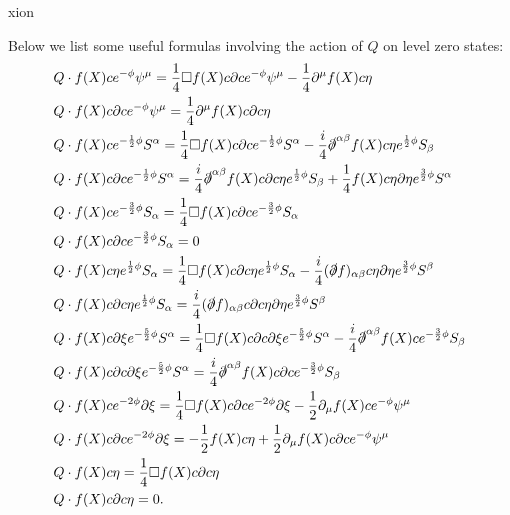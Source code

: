 xion\documentclass[12pt]{article}
\numberwithin{equation}{section}
\begin{document}
{\allowdisplaybreaks
Below we list some useful formulas involving the action of $Q$ on level zero states:
\begin{align}
&Q \cdot f(X) ce^{-\phi}\psi^\mu = \frac14 \Box f(X) c \partial c  e^{-\phi}\psi^\mu  - \frac{1}{4} \partial^\mu f(X) c\eta \\
&Q \cdot f(X) c \partial c e^{-\phi}\psi^\mu  = \frac{1}{4}\partial^\mu f(X) c \partial c \eta  \\
&Q \cdot f(X) ce^{-\frac12\phi}S^\alpha  = \frac14 \Box f(X) c \partial c  e^{-\frac12\phi}S^\alpha - \frac{i}{4} \slashed{\partial}^{\alpha\beta} f(X) c \eta e^{\frac{1}{2}\phi} S_\beta \\
&Q \cdot f(X) c \partial c e^{-\frac12\phi}S^\alpha  =  \frac{i}{4}\slashed{\partial}^{\alpha \beta}f(X) c\partial c \eta e^{\frac{1}{2}\phi}S_\beta + \frac{1}{4} f(X) c \eta \partial \eta e^{\frac32\phi} S^\alpha\\
&Q \cdot f(X) ce^{-\frac32\phi}S_\alpha = \frac14 \Box f(X) c \partial c e^{-\frac32\phi}S_\alpha \\
&Q \cdot f(X) c \partial ce^{-\frac32\phi}S_\alpha = 0 \\
& Q \cdot f(X) c \eta e^{\frac{1}{2}\phi} S_\alpha = \frac{1}{4} \Box f(X) c\partial c \eta e^{\frac{1}{2}\phi} S_\alpha - \frac{i}{4} (\slashed{\partial} f)_{\alpha \beta} c \eta \partial \eta e^{\frac{3}{2} \phi} S^\beta \\
& Q \cdot f(X) c \partial c \eta e^{\frac{1}{2}\phi} S_\alpha = \frac{i}{4} (\slashed{\partial} f)_{\alpha \beta} c \partial c \eta \partial \eta e^{\frac{3}{2} \phi} S^\beta\\
&Q \cdot f(X) c \partial \xi e^{-\frac52\phi}S^\alpha  = \frac14 \Box f(X) c \partial c \partial \xi e^{-\frac52\phi}S^\alpha - \frac{i}{4} \slashed{\partial}^{\alpha \beta}f(X) c e^{-\frac32\phi}S_\beta \\
&Q \cdot f(X) c \partial c \partial \xi e^{-\frac52\phi}S^\alpha = \frac{i}{4} \slashed{\partial}^{\alpha \beta}f(X) c \partial c e^{-\frac32\phi}S_\beta\\
&Q \cdot f(X) c e^{-2\phi}\partial\xi = \frac{1}{4} \Box f(X) c \partial c e^{-2\phi}\partial \xi - \frac{1}{2} \partial_\mu f(X) c e^{-\phi} \psi^\mu \\
&Q \cdot f(X) c \partial c e^{-2\phi}\partial\xi = -\frac{1}{2} f(X) c \eta + \frac{1}{2}\partial_\mu f(X) c \partial c e^{-\phi} \psi^\mu \\
& Q \cdot f(X) c \eta=  \frac{1}{4}\Box f(X) c\partial c \eta \\
& Q \cdot f(X) c\partial c \eta = 0.
\label{QAct}
\end{align}
}
\end{document}
